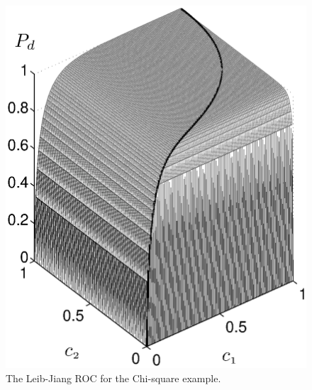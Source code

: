 \documentclass[12pt,journal,a4paper,twoside,onecolumn,draft]{IEEEtran}
\begin{document}
\begin{spacing}{2.5}
\begin{figure}[!t]
\centering
\includegraphics[width=12cm]{chi2ROC.eps}
\caption{The Leib-Jiang ROC for the Chi-square example.}
\label{pic: LJS for chisquare}
\end{figure}



\end{spacing}
\end{document}
